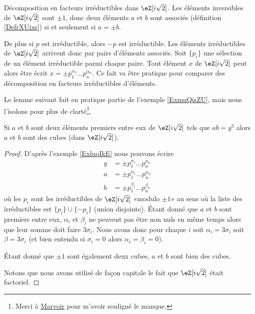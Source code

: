\begin{example} \label{ExluqIkE}
    Décomposition en facteurs irréductibles dans \( \eZ[i\sqrt{2}]\). Les éléments inversibles de \( \eZ[i\sqrt{2}]\) sont \( \pm 1\), donc deux éléments \( a\) et \( b\) sont associés (définition \ref{DefrXUixs}) si et seulement si \( a=\pm b\).

    De plus si \( p\) est irréductible, alors \( -p\) est irréductible. Les éléments irréductibles de \( \eZ[i\sqrt{2}]\) arrivent donc par pairs d'éléments associés. Soit \( \{ p_i \}\) une sélection de un élément irréductible parmi chaque paire. Tout élément \( x\) de \( \eZ[i\sqrt{2}]\) peut alors être écrit \( x=\pm p_1^{\alpha_1}\ldots p_n^{\alpha_n}\). Ce fait va être pratique pour comparer des décomposition en facteurs irréductibles d'éléments.
\end{example}

Le lemme suivant fait en pratique partie de l'exemple \ref{ExmuQisZU}, mais nous l'isolons pour plus de clarté\footnote{Merci à \href{http://fr.wikipedia.org/wiki/Utilisateur:Marvoir}{Marvoir} pour m'avoir souligné le manque.}.
\begin{lemma}       \label{LemTScCIv}
    Si \( a\) et \( b\) sont deux éléments premiers entre eux de \( \eZ[i\sqrt{2}]\) tels que \( ab=y^3\) alors \( a\) et \( b\) sont des cubes (dans \( \eZ[i\sqrt{2}]\)).
\end{lemma}

\begin{proof}
    D'après l'exemple \ref{ExluqIkE} nous pouvons écrire
    \begin{subequations}
        \begin{align}
            y&=\pm p_1^{\sigma_1}\ldots p_n^{\sigma_n}\\
            a&=\pm p_1^{\alpha_1}\ldots p_n^{\alpha_n}\\
            b&=\pm p_1^{\beta_1}\ldots p_n^{\beta_n}
        \end{align}
    \end{subequations}
    où les \( p_i\) sont les irréductibles de \( \eZ[i\sqrt{2}]\) «modulo \( \pm 1\)» au sens où la liste des irréductibles est \( \{ p_i \}\cup\{ -p_i \}\) (union disjointe). Étant donné que \( a\) et \( b\) sont premiers entre eux, \( \alpha_i\) et \( \beta_i\) ne peuvent pas être non nuls en même temps alors que leur somme doit faire \( 3\sigma_i\). Nous avons donc pour chaque \( i\) soit \( \alpha_i=3\sigma_i\) soit \( \beta=3\sigma_i\) (et bien entendu si \( \sigma_i=0\) alors \( \alpha_i=\beta_i=0\)).

    Étant donné que \( \pm 1\) sont également deux cubes, \( a\) et \( b\) sont bien des cubes.

    Notons que nous avons utilisé de façon capitale le fait que \( \eZ[i\sqrt{2}]\) était factoriel.
\end{proof}

